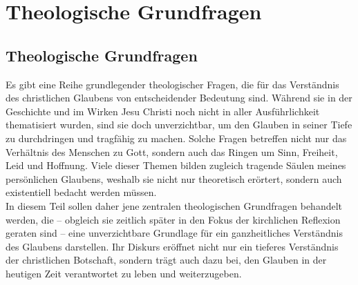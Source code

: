 \part{Theologische Grundfragen}
\chapter*{Theologische Grundfragen}
Es gibt eine Reihe grundlegender theologischer Fragen, die für das Verständnis des christlichen Glaubens von entscheidender Bedeutung sind. Während sie in der Geschichte und im Wirken Jesu Christi noch nicht in aller Ausführlichkeit thematisiert wurden, sind sie doch unverzichtbar, um den Glauben in seiner Tiefe zu durchdringen und tragfähig zu machen. Solche Fragen betreffen nicht nur das Verhältnis des Menschen zu Gott, sondern auch das Ringen um Sinn, Freiheit, Leid und Hoffnung. Viele dieser Themen bilden zugleich tragende Säulen meines persönlichen Glaubens, weshalb sie nicht nur theoretisch erörtert, sondern auch existentiell bedacht werden müssen.\\

In diesem Teil sollen daher jene zentralen theologischen Grundfragen behandelt werden, die – obgleich sie zeitlich später in den Fokus der kirchlichen Reflexion geraten sind – eine unverzichtbare Grundlage für ein ganzheitliches Verständnis des Glaubens darstellen. Ihr Diskurs eröffnet nicht nur ein tieferes Verständnis der christlichen Botschaft, sondern trägt auch dazu bei, den Glauben in der heutigen Zeit verantwortet zu leben und weiterzugeben.




